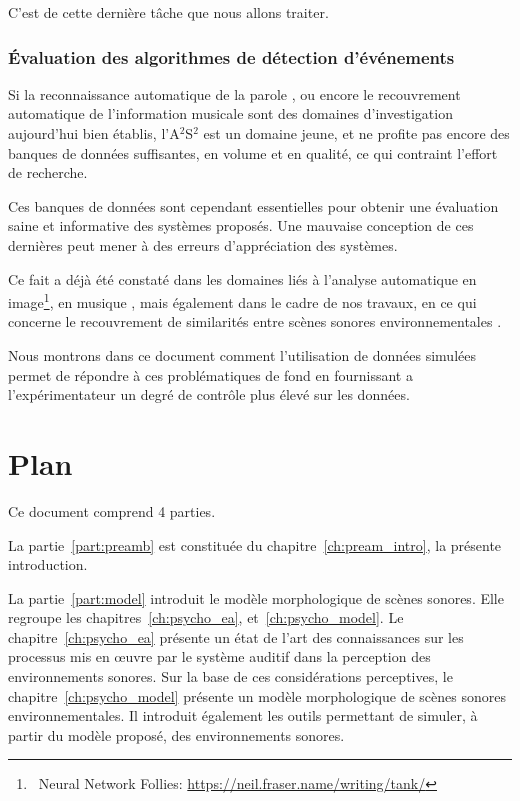 C'est de cette dernière tâche que nous allons traiter.

\subsubsection{Évaluation des algorithmes de détection d'événements}

Si la reconnaissance automatique de la parole \citep{Rabiner93}, ou encore le recouvrement automatique de l'information musicale \citep{Muller07} sont des domaines d'investigation aujourd'hui bien établis, l'A$^2$S$^2$ est un domaine jeune, et ne profite pas encore des banques de données suffisantes, en volume et en qualité, ce qui contraint l'effort de recherche.

Ces banques de données sont cependant essentielles pour obtenir une évaluation saine et informative des systèmes proposés. Une mauvaise conception de ces dernières peut mener à des erreurs d’appréciation des systèmes. 

Ce fait a déjà été constaté dans les domaines liés à l’analyse automatique en image\footnote{\cf~Neural Network Follies: \url{https://neil.fraser.name/writing/tank/}}, en musique \citep{sturm2014simple}, mais également dans le cadre de nos travaux, en ce qui concerne le recouvrement de similarités entre scènes sonores environnementales \citep{lafay2016JAES}.

Nous montrons dans ce document comment l'utilisation de données simulées permet de répondre à ces problématiques de fond en fournissant a l'expérimentateur un degré de contrôle plus élevé sur les données.




\section{Plan}

Ce document comprend 4 parties.

La partie~\ref{part:preamb} est constituée du chapitre~\ref{ch:pream_intro}, la présente introduction.

La partie~\ref{part:model} introduit le modèle morphologique de scènes sonores. Elle regroupe les chapitres~\ref{ch:psycho_ea}, et~\ref{ch:psycho_model}. Le chapitre~\ref{ch:psycho_ea} présente un état de l'art des connaissances sur les processus mis en œuvre par le système auditif dans la perception des environnements sonores. Sur la base de ces considérations perceptives, le chapitre~\ref{ch:psycho_model} présente un modèle morphologique de scènes sonores environnementales. Il introduit également les outils permettant de simuler, à partir du modèle proposé, des environnements sonores.

